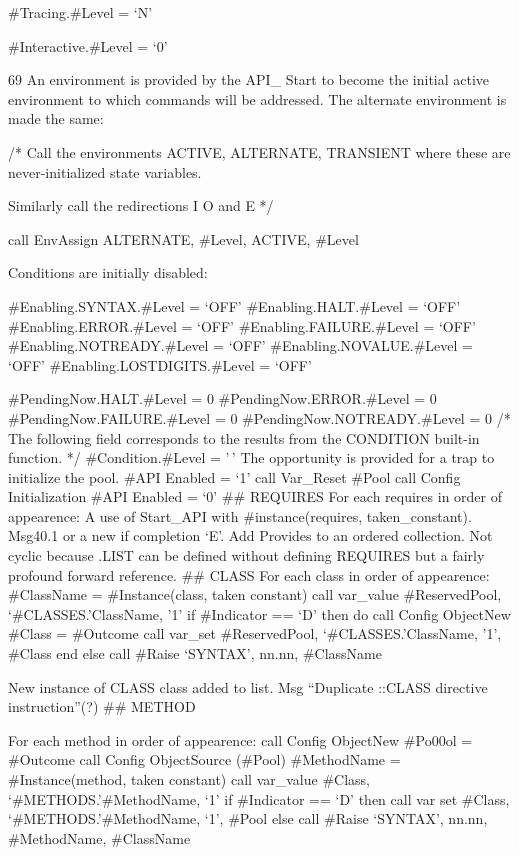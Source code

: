 \#Tracing.\#Level = `N'

\#Interactive.\#Level = `0'

69 An environment is provided by the API\_ Start to become the initial
active environment to which commands will be addressed. The alternate
environment is made the same:

/* Call the environments ACTIVE, ALTERNATE, TRANSIENT where these are
never-initialized state variables.

Similarly call the redirections I O and E */

call EnvAssign ALTERNATE, \#Level, ACTIVE, \#Level

Conditions are initially disabled:

\#Enabling.SYNTAX.\#Level = `OFF' \#Enabling.HALT.\#Level = `OFF'
\#Enabling.ERROR.\#Level = `OFF' \#Enabling.FAILURE.\#Level = `OFF'
\#Enabling.NOTREADY.\#Level = `OFF' \#Enabling.NOVALUE.\#Level = `OFF'
\#Enabling.LOSTDIGITS.\#Level = `OFF'

\#PendingNow.HALT.\#Level = 0 \#PendingNow.ERROR.\#Level = 0
\#PendingNow.FAILURE.\#Level = 0 \#PendingNow.NOTREADY.\#Level = 0 /*
The following field corresponds to the results from the CONDITION
built-in function. */ \#Condition.\#Level = '\,' The opportunity is
provided for a trap to initialize the pool. \#API Enabled = `1' call
Var\_Reset \#Pool call Config Initialization \#API Enabled = `0' \#\#
REQUIRES For each requires in order of appearence: A use of Start\_API
with \#instance(requires, taken\_constant). Msg40.1 or a new if
completion `E'. Add Provides to an ordered collection. Not cyclic
because .LIST can be defined without defining REQUIRES but a fairly
profound forward reference. \#\# CLASS For each class in order of
appearence: \#ClassName = \#Instance(class, taken constant) call
var\_value \#ReservedPool, `\#CLASSES.'ClassName, '1' if \#Indicator ==
`D' then do call Config ObjectNew \#Class = \#Outcome call var\_set
\#ReservedPool, `\#CLASSES.'ClassName, '1', \#Class end else call
\#Raise `SYNTAX', nn.nn, \#ClassName

New instance of CLASS class added to list. Msg ``Duplicate ::CLASS
directive instruction''(?) \#\# METHOD

For each method in order of appearence: call Config ObjectNew \#Po00ol =
\#Outcome call Config ObjectSource (\#Pool) \#MethodName =
\#Instance(method, taken constant) call var\_value \#Class,
`\#METHODS.'\#MethodName, `1' if \#Indicator == `D' then call var set
\#Class, `\#METHODS.'\#MethodName, `1', \#Pool else call \#Raise
`SYNTAX', nn.nn, \#MethodName, \#ClassName

